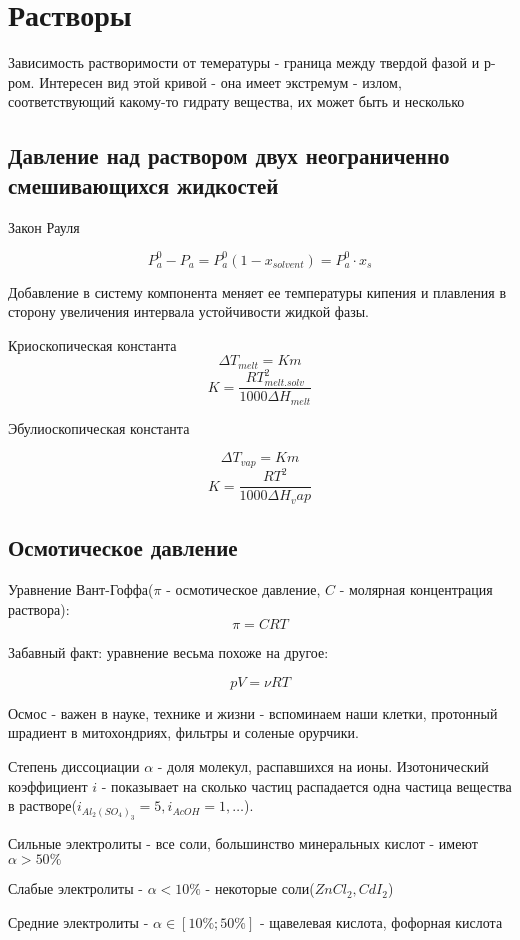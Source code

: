 \documentclass[11pt]{article}
\begin{document}
\section{Растворы}

Зависимость растворимости от темературы - граница между твердой фазой и р-ром. Интересен вид этой кривой - она имеет экстремум - излом, соответствующий какому-то гидрату вещества, их может быть и несколько

\subsection{Давление над раствором двух неограниченно смешивающихся жидкостей}

Закон Рауля

$$P_a^0 - P_a = P_a^0(1-x_{solvent}) = P_a^0\cdot x_s$$

Добавление в систему компонента меняет ее температуры кипения и плавления в сторону увеличения интервала устойчивости жидкой фазы.

Криоскопическая константа
$$\Delta T_{melt} = Km$$
$$K = \frac{R T_{melt.solv}^2}{1000\Delta H_{melt}}$$

Эбулиоскопическая константа

$$\Delta T_{vap} = Km$$
$$K = \frac{RT^2}{1000\Delta H_vap}$$

\subsection{Осмотическое давление}
Уравнение Вант-Гоффа($\pi$ - осмотическое давление, $C$ - молярная концентрация раствора):
$$\pi = CRT$$

Забавный факт: уравнение весьма похоже на другое:

$$pV = \nu RT$$

Осмос - важен в науке, технике и жизни - вспоминаем наши клетки, протонный шрадиент в митохондриях, фильтры и соленые орурчики.

Степень диссоциации $\alpha$ - доля молекул, распавшихся на ионы. Изотонический коэффициент $i$ - показывает на сколько частиц распадается одна частица вещества в растворе($i_{Al_2(SO_4)_3} =5, i_{AcOH} = 1,\ldots$).

Сильные электролиты - все соли, большинство минеральных кислот - имеют $\alpha > 50\%$

Слабые электролиты - $\alpha < 10\%$ - некоторые соли($ZnCl_2, CdI_2$)

Средние электролиты - $\alpha \in [10 \%;50 \%]$ - щавелевая кислота, фофорная кислота
\end{document}
